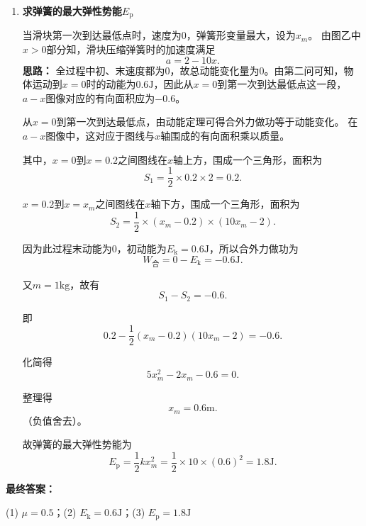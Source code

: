 \documentclass[CJKmath,a4paper,10pt]{ctexart}
\begin{document}
\begin{liti}
\begin{enumerate}
\item \textbf{求弹簧的最大弹性势能$E_\text{p}$}

当滑块第一次到达最低点时，速度为$0$，弹簧形变量最大，设为$x_m$。
由图乙中$x>0$部分知，滑块压缩弹簧时的加速度满足
\[
a=2-10x.
\]
\textbf{思路：} 全过程中初、末速度都为$0$，故总动能变化量为$0$。由第二问可知，物体运动到$x=0$时的动能为$0.6\mathrm{J}$，因此从$x=0$到第一次到达最低点这一段，$a-x$图像对应的有向面积应为$-0.6$。
	
从$x=0$到第一次到达最低点，由动能定理可得合外力做功等于动能变化。
在$a-x$图像中，这对应于图线与$x$轴围成的有向面积乘以质量。

其中，$x=0$到$x=0.2$之间图线在$x$轴上方，围成一个三角形，面积为
\[
S_1=\frac12\times 0.2\times 2=0.2.
\]

$x=0.2$到$x=x_m$之间图线在$x$轴下方，围成一个三角形，面积为
\[
S_2=\frac12\times (x_m-0.2)\times (10x_m-2).
\]

因为此过程末动能为$0$，初动能为$E_\text{k}=0.6\mathrm{J}$，所以合外力做功为
\[
W_\text{合}=0-E_\text{k}=-0.6\mathrm{J}.
\]

又$m=1\mathrm{kg}$，故有
\[
S_1-S_2=-0.6.
\]

即
\[
0.2-\frac12(x_m-0.2)(10x_m-2)=-0.6.
\]

化简得
\[
5x_m^2-2x_m-0.6=0.
\]

整理得
\[
x_m=0.6\mathrm{m}.
\]
（负值舍去）。

故弹簧的最大弹性势能为
\[
E_\text{p}=\frac12 kx_m^2=\frac12\times10\times(0.6)^2=1.8\mathrm{J}.
\]
\end{enumerate}
\noindent
\textbf{最终答案：}
\begin{marker}
(1) $\boxed{\mu=0.5}$；(2) $\boxed{E_\text{k}=0.6\mathrm{J}}$；(3) $\boxed{E_\text{p}=1.8\mathrm{J}}$
\end{marker}
\end{liti}
\end{document}
